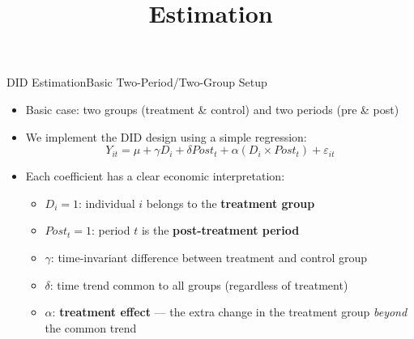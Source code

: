 \documentclass[dvipsnames,hyperref={pdfpagelabels=false}]{beamer}
\begin{document}
\title[]  
{Estimation}


\author 
{}

\institute{}






\date
{}


\begin{frame}{}
	\titlepage
\end{frame}



\begin{frame}{DID Estimation}{Basic Two-Period/Two-Group Setup}
\begin{itemize}
    \item Basic case: two groups (treatment \& control) and two periods (pre \& post)
    \vspace{0.2cm}
    \item We implement the DID design using a simple regression:
    \begin{equation*}
        Y_{it} = \mu + \gamma D_{i} + \delta Post_{t} + \alpha (D_{i} \times Post_{t}) + \varepsilon_{it}
    \end{equation*}
    \item Each coefficient has a clear economic interpretation:
    \vspace{0.2cm}
    \begin{itemize}
        \item $D_i = 1$: individual $i$ belongs to the \textbf{treatment group}
        \vspace{0.2cm}
        \item $Post_t = 1$: period $t$ is the \textbf{post-treatment period}
        \vspace{0.2cm}
        \item $\gamma$: time-invariant difference between treatment and control group
        \vspace{0.2cm}
        \item $\delta$: time trend common to all groups (regardless of treatment)
        \vspace{0.2cm}
        \item $\alpha$: \textbf{treatment effect} --- the extra change in the treatment group \emph{beyond} the common trend
    \end{itemize}
\end{itemize}
\end{frame}
\end{document}
